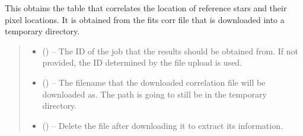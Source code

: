\documentclass[letterpaper,11pt,english]{sphinxmanual}
\begin{document}
\begin{savenotes}
\begin{fulllineitems}
\begin{savenotes}\begin{fulllineitems}
\label{\detokenize{code/opihiexarata.astrometry.webclient:opihiexarata.astrometry.webclient.AstrometryNetWebAPIEngine.get_reference_star_pixel_correlation}}
\pysigstartsignatures
{}
\pysigstopsignatures
\sphinxAtStartPar
This obtains the table that correlates the location of reference
stars and their pixel locations. It is obtained from the fits corr file
that is downloaded into a temporary directory.
\begin{quote}\begin{description}
\begin{itemize}
\item {} 
\sphinxAtStartPar
{} (\sphinxstyleliteralemphasis{\sphinxupquote{, }}) – The ID of the job that the results should be obtained from. If not
provided, the ID determined by the file upload is used.

\item {} 
\sphinxAtStartPar
{} (\sphinxstyleliteralemphasis{\sphinxupquote{, }}) – The filename that the downloaded correlation file will be
downloaded as. The path is going to still be in the temporary
directory.

\item {} 
\sphinxAtStartPar
{} (\sphinxstyleliteralemphasis{\sphinxupquote{, }}) – Delete the file after downloading it to extract its information.


\end{itemize}
\end{description}
\end{quote}
\end{fulllineitems}
\end{savenotes}
\end{fulllineitems}
\end{savenotes}
\end{document}
